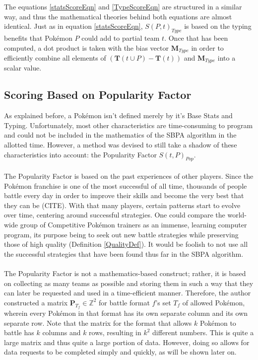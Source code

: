 \documentclass{article}
\begin{document}
The equations \ref{statsScoreEqn} and \ref{TypeScoreEqn} are structured in a similar way, and thus the mathematical theories behind both equations are almost identical. Just as in equation \ref{statsScoreEqn}, $S(P,t)_{Type}$ is based on the typing benefits that Pok\'emon $P$ could add to partial team $t$. Once that has been computed, a dot product is taken with the bias vector $\textbf{M}_{Type}$ in order to efficiently combine all elements of $(\textbf{T}(t\cup P)-\textbf{T}(t))$ and $\textbf{M}_{Type}$ into a scalar value.

\subsection{Scoring Based on Popularity Factor}
As explained before, a Pok\'emon isn't defined merely by it's Base Stats and Typing. Unfortunately, most other characteristics are time-consuming to program and could not be included in the mathematics of the SBPA algorithm in the allotted time. However, a method was devised to still take a shadow of these characteristics into account: the Popularity Factor $S(t,P)_{Pop}$.\\\\
The Popularity Factor is based on the past experiences of other players. Since the Pok\'emon franchise is one of the most successful of all time, thousands of people battle every day in order to improve their skills and become the very best that they can be (CITE). With that many players, certain patterns start to evolve over time, centering around successful strategies. One could compare the world-wide group of Competitive Pok\'emon trainers as an immense, learning computer program, its purpose being to seek out new battle strategies while preserving those of high quality (Definition \ref{QualityDef}). It would be foolish to not use all the successful strategies that have been found thus far in the SBPA algorithm.\\\\
The Popularity Factor is not a mathematics-based construct; rather, it is based on collecting as many teams as possible and storing them in such a way that they can later be requested and used in a time-efficient manner. Therefore, the author constructed a matrix $\textbf{P}_{T_f}\in\mathbb{Z}^2$ for battle format $f$'s set $T_f$ of allowed Pok\'emon, wherein every Pok\'emon in that format has its own separate column and its own separate row. Note that the matrix for the format that allows $k$ Pok\'emon to battle has $k$ columns and $k$ rows, resulting in $k^2$ different numbers. This is quite a large matrix and thus quite a large portion of data. However, doing so allows for data requests to be completed simply and quickly, as will be shown later on.\\\\
\end{document}
